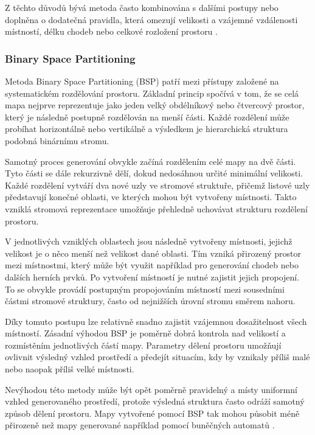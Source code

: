 \documentclass[
  program=itk,
  biblatex,
  figures=false,
  glossaries,
  index
]{kidiplom}
\begin{document}
Z těchto důvodů bývá metoda často kombinována s dalšími postupy nebo doplněna o dodatečná pravidla, která omezují velikosti a vzájemné vzdálenosti místností, délku chodeb nebo celkové rozložení prostoru \cite{Linden2014,Shaker2016}.

\subsubsection{Binary Space Partitioning}

Metoda Binary Space Partitioning (BSP) patří mezi přístupy založené na systematickém rozdělování prostoru. Základní princip spočívá v tom, že se celá mapa nejprve reprezentuje jako jeden velký obdélníkový nebo čtvercový prostor, který je následně postupně rozdělován na menší části. Každé rozdělení může probíhat horizontálně nebo vertikálně a výsledkem je hierarchická struktura podobná binárnímu stromu.

Samotný proces generování obvykle začíná rozdělením celé mapy na dvě části. Tyto části se dále rekurzivně dělí, dokud nedosáhnou určité minimální velikosti. Každé rozdělení vytváří dva nové uzly ve stromové struktuře, přičemž listové uzly představují konečné oblasti, ve kterých mohou být vytvořeny místnosti. Takto vzniklá stromová reprezentace umožňuje přehledně uchovávat strukturu rozdělení prostoru.

V jednotlivých vzniklých oblastech jsou následně vytvořeny místnosti, jejichž velikost je o něco menší než velikost dané oblasti. Tím vzniká přirozený prostor mezi místnostmi, který může být využit například pro generování chodeb nebo dalších herních prvků. Po vytvoření místností je nutné zajistit jejich propojení. To se obvykle provádí postupným propojováním místností mezi sousedními částmi stromové struktury, často od nejnižších úrovní stromu směrem nahoru.

Díky tomuto postupu lze relativně snadno zajistit vzájemnou dosažitelnost všech místností. Zásadní výhodou BSP je poměrně dobrá kontrola nad velikostí a rozmístěním jednotlivých částí mapy. Parametry dělení prostoru umožňují ovlivnit výsledný vzhled prostředí a předejít situacím, kdy by vznikaly příliš malé nebo naopak příliš velké místnosti.

Nevýhodou této metody může být opět poměrně pravidelný a místy uniformní vzhled generovaného prostředí, protože výsledná struktura často odráží samotný způsob dělení prostoru. Mapy vytvořené pomocí BSP tak mohou působit méně přirozeně než mapy generované například pomocí buněčných automatů \cite{Linden2014,Shaker2016}.
\end{document}
